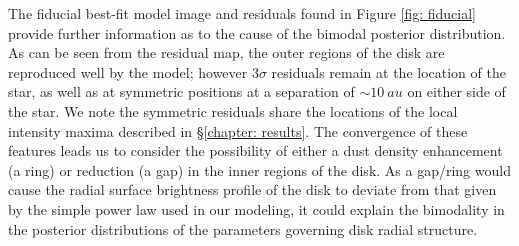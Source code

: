 \documentclass[12pt,oneside]{book}
\begin{document}
The fiducial best-fit model image and residuals found in Figure \ref{fig: fiducial} provide further information as to the cause of the bimodal posterior distribution.
As can be seen from the residual map, the outer regions of the disk are reproduced well by the model; however $3\sigma$ residuals remain at the location of the star, as well as at symmetric positions at a separation of $\sim \SI{10}{au}$ on either side of the star. 
We note the symmetric residuals share the locations of the local intensity maxima described in \S \ref{chapter: results}. 
The convergence of these features leads us to consider the possibility of either a dust density enhancement (a ring) or reduction (a gap) in the inner regions of the disk. 
As a gap/ring would cause the radial surface brightness profile of the disk to deviate from that given by the simple power law used in our modeling, it could explain the bimodality in the posterior distributions of the parameters governing disk radial structure.
\end{document}
